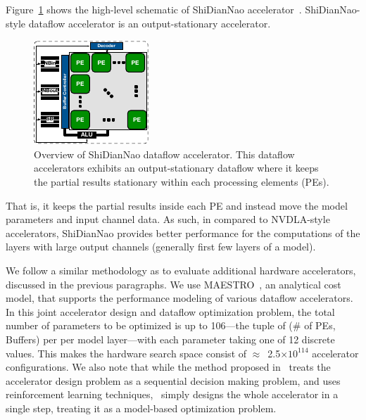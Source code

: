 %
Figure~\ref{fig:shi_dla} shows the high-level schematic of ShiDianNao accelerator~\citep{shidiannao}.
%
ShiDianNao-style dataflow accelerator is an output-stationary accelerator.
%
\begin{figure}[t!]
\centering
    \includegraphics[width=0.35\linewidth]{chapters/prime/figs/accelerator/shidian.pdf}
    \caption{Overview of ShiDianNao dataflow accelerator. This dataflow accelerators exhibits an output-stationary dataflow where it keeps the partial results stationary within each processing elements (PEs).}
    \label{fig:shi_dla}
    \vspace{-0.1in} 
\end{figure}
That is, it keeps the partial results inside each PE and instead move the model parameters and input channel data. 
%
As such, in compared to NVDLA-style accelerators, ShiDianNao provides better performance for the computations of the layers with large output channels (generally first few layers of a model).

%
We follow a similar methodology as \citep{kao2020confuciux} to evaluate additional hardware accelerators, discussed in the previous paragraphs.
%
We use MAESTRO~\citep{maestro}, an analytical cost model, that supports the performance modeling of various dataflow accelerators.
%
In this joint accelerator design and dataflow optimization problem, the total number of parameters to be optimized is up to 106---the tuple of (\# of PEs, Buffers) per per model layer---with each parameter taking one of 12 discrete values. This makes the hardware search space consist of $\approx$~2.5$\times10^{114}$ accelerator configurations.
%
We also note that while the method proposed in~\citep{kao2020confuciux} treats the accelerator design problem as a sequential decision making problem, and uses reinforcement learning techniques, \primemethodname\ simply designs the whole accelerator in a single step, treating it as a model-based optimization problem.

